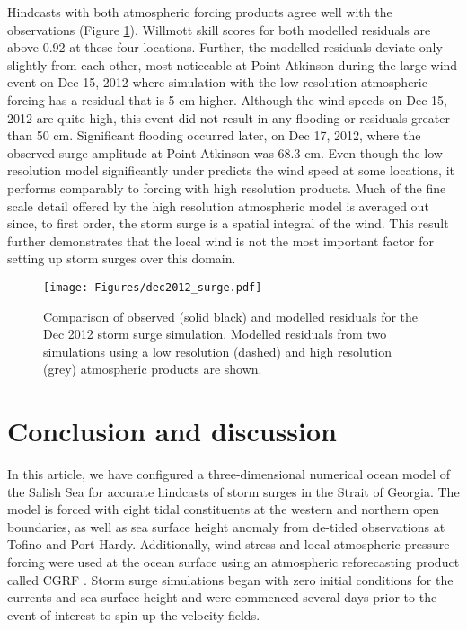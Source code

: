 \documentclass{tATO2e}
\begin{document}
Hindcasts with both atmospheric forcing products agree well with the observations (Figure \ref{fig:dec2012_surge}). Willmott skill scores for both modelled residuals are above 0.92 at these four locations. Further, the modelled residuals deviate only slightly from each other, most noticeable at Point Atkinson during the large wind event on Dec 15, 2012 where simulation with the low resolution atmospheric forcing has a residual that is 5 cm higher. Although the wind speeds on Dec 15, 2012 are quite high, this event did not result in any flooding or residuals greater than 50 cm. Significant flooding occurred later, on Dec 17, 2012, where the observed surge amplitude at Point Atkinson was 68.3 cm. Even though the low resolution model significantly under predicts the wind speed at some locations, it performs comparably to forcing with high resolution products. Much of the fine scale detail offered by the high resolution atmospheric model is averaged out since, to first order, the storm surge is a spatial integral of the wind. This result further demonstrates that the local wind is not the most important factor for setting up storm surges over this domain. 

\begin{figure}
\centering
\texttt{[image: Figures/dec2012\_surge.pdf]}
\caption{Comparison of observed (solid black) and modelled residuals for the Dec 2012 storm surge simulation. Modelled residuals from two simulations using a low resolution (dashed) and high resolution (grey) atmospheric products are shown. }
\label{fig:dec2012_surge}
\end{figure}

\section{Conclusion and discussion}\label{sec:diss}
In this article, we have configured a three-dimensional numerical ocean model of the Salish Sea for accurate hindcasts of storm surges in the Strait of Georgia. The model is forced with eight tidal constituents at the western and northern open boundaries, as well as sea surface height anomaly from de-tided observations at Tofino and Port Hardy. Additionally, wind stress and local atmospheric pressure forcing were used at the ocean surface using an atmospheric reforecasting product called CGRF \citep{smith2014new}. Storm surge simulations began with zero initial conditions for the currents and sea surface height and were commenced several days prior to the event of interest to spin up the velocity fields. 
\end{document}
